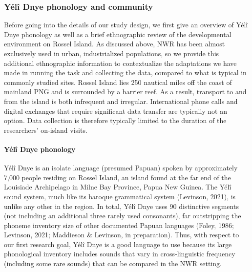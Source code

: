 \documentclass[
  american,
  ,man,floatsintext]{apa6}
\let\oldparagraph\paragraph
\renewcommand{\paragraph}[1]{\oldparagraph{#1}\mbox{}}
\begin{document}
\hypertarget{yuxe9luxee-dnye-phonology-and-community}{%
\subsubsection{Yélî Dnye phonology and community}\label{yuxe9luxee-dnye-phonology-and-community}}

Before going into the details of our study design, we first give an overview of Yélî Dnye phonology as well as a brief ethnographic review of the developmental environment on Rossel Island. As discussed above, NWR has been almost exclusively used in urban, industrialized populations, so we provide this additional ethnographic information to contextualize the adaptations we have made in running the task and collecting the data, compared to what is typical in commonly studied sites. Rossel Island lies 250 nautical miles off the coast of mainland PNG and is surrounded by a barrier reef. As a result, transport to and from the island is both infrequent and irregular. International phone calls and digital exchanges that require significant data transfer are typically not an option. Data collection is therefore typically limited to the duration of the researchers' on-island visits.

\hypertarget{yuxe9luxee-dnye-phonology}{%
\paragraph{Yélî Dnye phonology}\label{yuxe9luxee-dnye-phonology}}

Yélî Dnye is an isolate language (presumed Papuan) spoken by approximately 7,000 people residing on Rossel Island, an island found at the far end of the Louisiade Archipelago in Milne Bay Province, Papua New Guinea. The Yélî sound system, much like its baroque grammatical system (Levinson, 2021), is unlike any other in the region. In total, Yélî Dnye uses 90 distinctive segments (not including an additional three rarely used consonants), far outstripping the phoneme inventory size of other documented Papuan languages (Foley, 1986; Levinson, 2021; Maddieson \& Levinson, in preparation). Thus, with respect to our first research goal, Yélî Dnye is a good language to use because its large phonological inventory includes sounds that vary in cross-linguistic frequency (including some rare sounds) that can be compared in the NWR setting.
\end{document}
